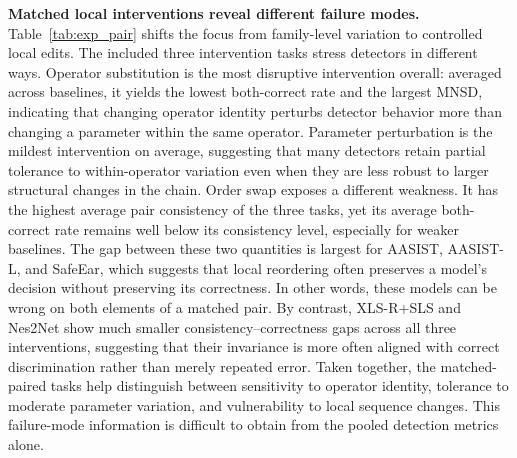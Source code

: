 \noindent\textbf{Matched local interventions reveal different failure modes.}
Table~\ref{tab:exp_pair} shifts the focus from family-level variation to controlled local edits. The included three intervention tasks stress detectors in different ways. Operator substitution is the most disruptive intervention overall: averaged across baselines, it yields the lowest both-correct rate and the largest MNSD, indicating that changing operator identity perturbs detector behavior more than changing a parameter within the same operator. Parameter perturbation is the mildest intervention on average, suggesting that many detectors retain partial tolerance to within-operator variation even when they are less robust to larger structural changes in the chain. Order swap exposes a different weakness. It has the highest average pair consistency of the three tasks, yet its average both-correct rate remains well below its consistency level, especially for weaker baselines. The gap between these two quantities is largest for AASIST, AASIST-L, and SafeEar, which suggests that local reordering often preserves a model's decision without preserving its correctness. In other words, these models can be wrong on both elements of a matched pair. By contrast, XLS-R+SLS and Nes2Net show much smaller consistency--correctness gaps across all three interventions, suggesting that their invariance is more often aligned with correct discrimination rather than merely repeated error. Taken together, the matched-paired tasks help distinguish between sensitivity to operator identity, tolerance to moderate parameter variation, and vulnerability to local sequence changes. This failure-mode information is difficult to obtain from the pooled detection metrics alone.

